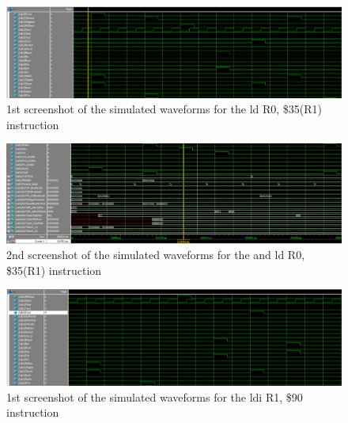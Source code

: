 \documentclass{article}
\begin{document}
        \begin{figure}[h!]
            \begin{center}
                \includegraphics[width=15cm]{ld_case_2_wave_top_half.png}
                \caption{1st screenshot of the simulated waveforms for the  ld R0, \$35(R1) instruction}
            \end{center}
        \end{figure}

        \begin{figure}[h!]
            \begin{center}
                \includegraphics[width=15cm]{ld_case_2_wave_bottom_half.png}
                \caption{2nd screenshot of the simulated waveforms for the and ld R0, \$35(R1) instruction}
            \end{center}
        \end{figure}

        \begin{figure}[h!]
            \begin{center}
                \includegraphics[width=15cm]{ldi_case_3_wave_top_half.png}
                \caption{1st screenshot of the simulated waveforms for the  ldi  R1, \$90 instruction}
            \end{center}
        \end{figure}
\end{document}
